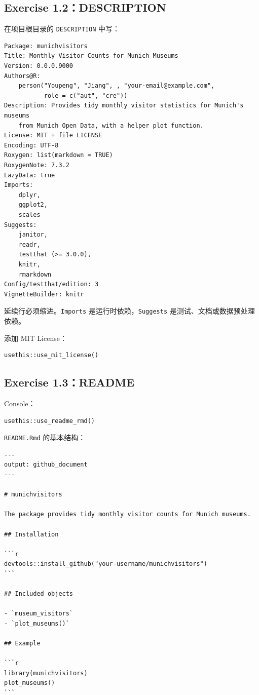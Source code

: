 \documentclass[11pt,a4paper]{ctexart}
\begin{document}
\subsection{Exercise 1.2：DESCRIPTION}

在项目根目录的 \texttt{DESCRIPTION} 中写：

\begin{verbatim}
Package: munichvisitors
Title: Monthly Visitor Counts for Munich Museums
Version: 0.0.0.9000
Authors@R:
    person("Youpeng", "Jiang", , "your-email@example.com",
           role = c("aut", "cre"))
Description: Provides tidy monthly visitor statistics for Munich's museums
    from Munich Open Data, with a helper plot function.
License: MIT + file LICENSE
Encoding: UTF-8
Roxygen: list(markdown = TRUE)
RoxygenNote: 7.3.2
LazyData: true
Imports:
    dplyr,
    ggplot2,
    scales
Suggests:
    janitor,
    readr,
    testthat (>= 3.0.0),
    knitr,
    rmarkdown
Config/testthat/edition: 3
VignetteBuilder: knitr
\end{verbatim}

延续行必须缩进。\texttt{Imports} 是运行时依赖，\texttt{Suggests} 是测试、文档或数据预处理依赖。

添加 MIT License：

\begin{lstlisting}
usethis::use_mit_license()
\end{lstlisting}

\subsection{Exercise 1.3：README}

Console：

\begin{lstlisting}
usethis::use_readme_rmd()
\end{lstlisting}

\texttt{README.Rmd} 的基本结构：

\begin{verbatim}
---
output: github_document
---

# munichvisitors

The package provides tidy monthly visitor counts for Munich museums.

## Installation

```r
devtools::install_github("your-username/munichvisitors")
```

## Included objects

- `museum_visitors`
- `plot_museums()`

## Example

```r
library(munichvisitors)
plot_museums()
```
\end{verbatim}
\end{document}
